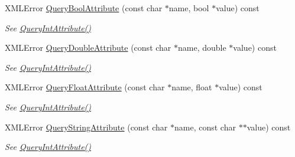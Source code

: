 \begin{DoxyCompactItemize}
\mbox{\label{classtinyxml2_1_1_x_m_l_element_a14c1bb77c39689838be01838d86ca872}} 
X\+M\+L\+Error \mbox{\hyperlink{classtinyxml2_1_1_x_m_l_element_a14c1bb77c39689838be01838d86ca872}{Query\+Bool\+Attribute}} (const char $\ast$name, bool $\ast$value) const
\begin{DoxyCompactList}\small\item\em See \mbox{\hyperlink{classtinyxml2_1_1_x_m_l_element_a8a78bc1187c1c45ad89f2690eab567b1}{Query\+Int\+Attribute()}} \end{DoxyCompactList}\item 
\mbox{\label{classtinyxml2_1_1_x_m_l_element_a5f0964e2dbd8e2ee7fce9beab689443c}} 
X\+M\+L\+Error \mbox{\hyperlink{classtinyxml2_1_1_x_m_l_element_a5f0964e2dbd8e2ee7fce9beab689443c}{Query\+Double\+Attribute}} (const char $\ast$name, double $\ast$value) const
\begin{DoxyCompactList}\small\item\em See \mbox{\hyperlink{classtinyxml2_1_1_x_m_l_element_a8a78bc1187c1c45ad89f2690eab567b1}{Query\+Int\+Attribute()}} \end{DoxyCompactList}\item 
\mbox{\label{classtinyxml2_1_1_x_m_l_element_acd5eeddf6002ef90806af794b9d9a5a5}} 
X\+M\+L\+Error \mbox{\hyperlink{classtinyxml2_1_1_x_m_l_element_acd5eeddf6002ef90806af794b9d9a5a5}{Query\+Float\+Attribute}} (const char $\ast$name, float $\ast$value) const
\begin{DoxyCompactList}\small\item\em See \mbox{\hyperlink{classtinyxml2_1_1_x_m_l_element_a8a78bc1187c1c45ad89f2690eab567b1}{Query\+Int\+Attribute()}} \end{DoxyCompactList}\item 
\mbox{\label{classtinyxml2_1_1_x_m_l_element_adb8ae765f98d0c5037faec48deea78bc}} 
X\+M\+L\+Error \mbox{\hyperlink{classtinyxml2_1_1_x_m_l_element_adb8ae765f98d0c5037faec48deea78bc}{Query\+String\+Attribute}} (const char $\ast$name, const char $\ast$$\ast$value) const
\begin{DoxyCompactList}\small\item\em See \mbox{\hyperlink{classtinyxml2_1_1_x_m_l_element_a8a78bc1187c1c45ad89f2690eab567b1}{Query\+Int\+Attribute()}} \end{DoxyCompactList}\item 
$$
\end{DoxyCompactItemize}
